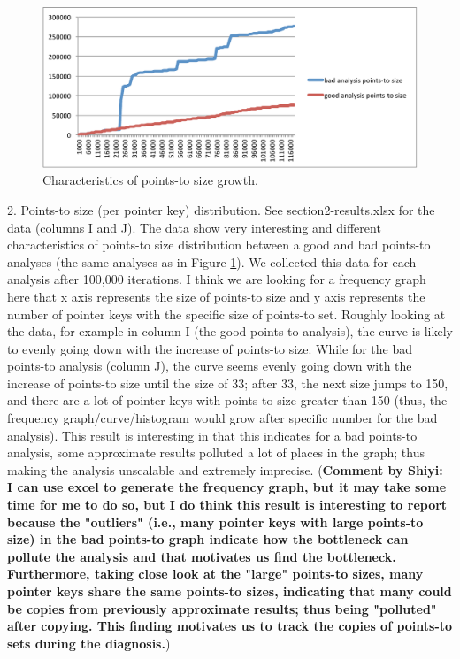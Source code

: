 \documentclass[a4paper,UKenglish]{lipics}
\begin{document}
\begin{figure}[th!]
        \includegraphics[width=0.95\columnwidth]{pts-growth}
\caption{\textmd{Characteristics of points-to size growth.}}
\label{fig:pts-growth}
\end{figure}

2. Points-to size (per pointer key) distribution. See section2-results.xlsx for the data (columns I and J). The data show very interesting and different characteristics of points-to size distribution between a good and bad points-to analyses (the same analyses as in Figure \ref{fig:pts-growth}). We collected this data for each analysis after 100,000 iterations. I think we are looking for a frequency graph here that x axis represents the size of points-to size and y axis represents the number of pointer keys with the specific size of points-to set. Roughly looking at the data, for example in column I (the good points-to analysis), the curve is likely to evenly going down with the increase of points-to size. While for the bad points-to analysis (column J), the curve seems evenly going down with the increase of points-to size until the size of 33; after 33, the next size jumps to 150, and there are a lot of pointer keys with points-to size greater than 150 (thus, the frequency graph/curve/histogram would grow after specific number for the bad analysis). This result is interesting in that this indicates for a bad points-to analysis, some approximate results polluted a lot of places in the graph; thus making the analysis unscalable and extremely imprecise. ({\bf Comment by Shiyi: I can use excel to generate the frequency graph, but it may take some time for me to do so, but I do think this result is interesting to report because the "outliers" (i.e., many pointer keys with large points-to size) in the bad points-to graph indicate how the bottleneck can pollute the analysis and that motivates us find the bottleneck. Furthermore, taking close look at the "large" points-to sizes, many pointer keys share the same points-to sizes, indicating that many could be copies from previously approximate results; thus being "polluted" after copying. This finding motivates us to track the copies of points-to sets during the diagnosis.})
\end{document}
